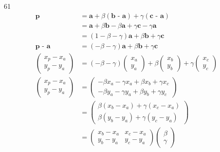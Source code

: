 \documentclass[12pt,border=4pt,multi]{article} %
\begin{document}
\section*{}
61
\begin{align*}
\textbf{p} &= \textbf{a} + \beta(\textbf{b - a}) + \gamma(\textbf{c - a})\\
&= \textbf{a} + \beta\textbf{b} - \beta\textbf{a} + \gamma\textbf{c} - \gamma\textbf{a}\\
&= (1 - \beta - \gamma)\textbf{a} + \beta\textbf{b} + \gamma\textbf{c}\\
\textbf{p - a} &= (- \beta - \gamma)\textbf{a} + \beta\textbf{b} + \gamma\textbf{c}\\
\begin{pmatrix}
x_p - x_a\\
y_p - y_a
\end{pmatrix}
&=
(- \beta - \gamma)
\begin{pmatrix}
x_a\\
y_a
\end{pmatrix}
+
\beta
\begin{pmatrix}
x_b\\
y_b
\end{pmatrix}
+
\gamma
\begin{pmatrix}
x_c\\
y_c
\end{pmatrix}
\\
\begin{pmatrix}
x_p - x_a\\
y_p - y_a
\end{pmatrix}
&=
\begin{pmatrix}
-\beta x_a - \gamma x_a + \beta x_b + \gamma x_c\\
-\beta y_a - \gamma y_a + \beta y_b + \gamma y_c
\end{pmatrix}
\\
&= 
\begin{pmatrix}
\beta (x_b - x_a) + \gamma (x_c - x_a)\\
\beta (y_b - y_a) + \gamma (y_c - y_a)
\end{pmatrix}
\\
&=
\begin{pmatrix}
x_b - x_a & x_c - x_a\\
y_b - y_a & y_c - y_a
\end{pmatrix}
\begin{pmatrix}
\beta\\
\gamma
\end{pmatrix}
\end{align*}\\
\end{document}
